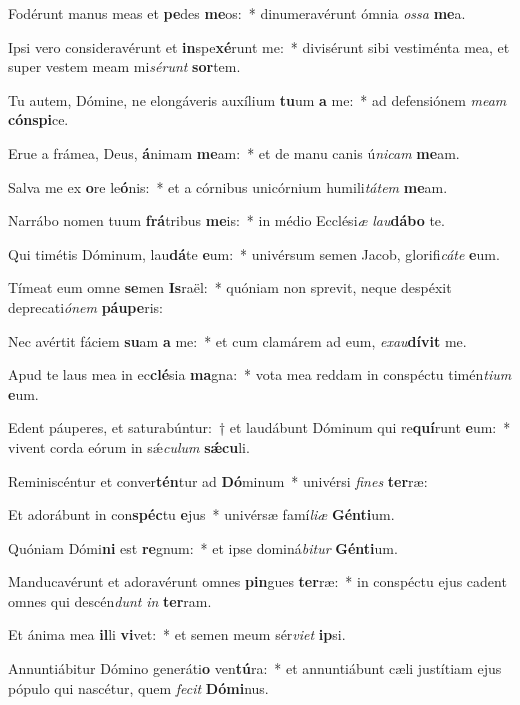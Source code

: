\item Fodérunt manus meas et \textbf{pe}des \textbf{me}os:~* dinumeravérunt ómnia \textit{os}\textit{sa} \textbf{me}a.
\item Ipsi vero consideravérunt et \textbf{in}spe\textbf{xé}runt me:~* divisérunt sibi vestiménta mea, et super vestem meam mi\textit{sé}\textit{runt} \textbf{sor}tem.
\item Tu autem, Dómine, ne elongáveris auxílium \textbf{tu}um \textbf{a} me:~* ad defensiónem \textit{me}\textit{am} \textbf{cón}\textbf{spi}ce.
\item Erue a frámea, Deus, \textbf{á}nimam \textbf{me}am:~* et de manu canis ú\textit{ni}\textit{cam} \textbf{me}am.
\item Salva me ex \textbf{o}re le\textbf{ó}nis:~* et a córnibus unicórnium humili\textit{tá}\textit{tem} \textbf{me}am.
\item Narrábo nomen tuum \textbf{frá}tribus \textbf{me}is:~* in médio Ecclési\textit{æ} \textit{lau}\textbf{dá}\textbf{bo} te.
\item Qui timétis Dóminum, lau\textbf{dá}te \textbf{e}um:~* univérsum semen Jacob, glorifi\textit{cá}\textit{te} \textbf{e}um.
\item Tímeat eum omne \textbf{se}men \textbf{Is}raël:~* quóniam non sprevit, neque despéxit deprecati\textit{ó}\textit{nem} \textbf{páu}\textbf{pe}ris:
\item Nec avértit fáciem \textbf{su}am \textbf{a} me:~* et cum clamárem ad eum, \textit{ex}\textit{au}\textbf{dí}\textbf{vit} me.
\item Apud te laus mea in ec\textbf{clé}sia \textbf{ma}gna:~* vota mea reddam in conspéctu timén\textit{ti}\textit{um} \textbf{e}um.
\item Edent páuperes, et saturabúntur:~† et laudábunt Dóminum qui re\textbf{quí}runt \textbf{e}um:~* vivent corda eórum in sǽ\textit{cu}\textit{lum} \textbf{sǽ}\textbf{cu}li.
\item Reminiscéntur et conver\textbf{tén}tur ad \textbf{Dó}minum~* univérsi \textit{fi}\textit{nes} \textbf{ter}ræ:
\item Et adorábunt in con\textbf{spéc}tu \textbf{e}jus~* univérsæ famí\textit{li}\textit{æ} \textbf{Gén}\textbf{ti}um.
\item Quóniam Dómi\textbf{ni} est \textbf{re}gnum:~* et ipse dominá\textit{bi}\textit{tur} \textbf{Gén}\textbf{ti}um.
\item Manducavérunt et adoravérunt omnes \textbf{pin}gues \textbf{ter}ræ:~* in conspéctu ejus cadent omnes qui descén\textit{dunt} \textit{in} \textbf{ter}ram.
\item Et ánima mea \textbf{il}li \textbf{vi}vet:~* et semen meum sér\textit{vi}\textit{et} \textbf{ip}si.
\item Annuntiábitur Dómino generáti\textbf{o} ven\textbf{tú}ra:~* et annuntiábunt cæli justítiam ejus pópulo qui nascétur, quem \textit{fe}\textit{cit} \textbf{Dó}\textbf{mi}nus.
